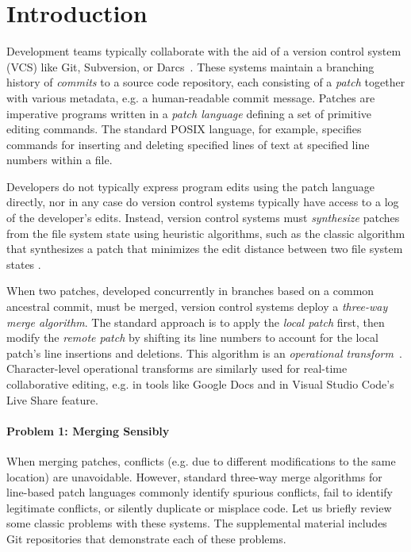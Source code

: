 
\section{Introduction}%
\label{sec:Introduction}

Development teams typically collaborate with the aid of a version control system (VCS) like Git, Subversion, or Darcs~\cite{DBLP:conf/haskell/Roundy05}. 
These systems maintain a branching history of \emph{commits} to a source code repository, each consisting of a \emph{patch} together with various metadata, e.g. a human-readable commit message. Patches are imperative programs written in a 
\emph{patch language} defining a set of primitive editing commands.
The standard POSIX  language, for example, specifies commands for inserting and deleting specified lines of text at specified line numbers within a file. 

Developers do not typically express program edits using the patch language directly, nor in any case do version control systems typically have access to a log of the developer's edits. Instead, version control systems must \emph{synthesize} patches from the file system state using heuristic algorithms, such as the classic  algorithm that synthesizes a patch that minimizes the edit distance between two file system states \cite{DiffAlgorithm}.

When two patches, developed concurrently in branches based on a common ancestral commit, must be merged, version control systems deploy a \emph{three-way merge algorithm}. The standard approach is to apply the \emph{local patch} first, then modify the \emph{remote patch} by shifting its line numbers to account for the local patch's line insertions and deletions. This algorithm is an \emph{operational transform}~\cite{DBLP:conf/sigmod/EllisG89}. 
Character-level operational transforms are similarly used for real-time collaborative editing, e.g. in tools like Google Docs and in Visual Studio Code's Live Share feature. 

\paragraph{Problem 1: Merging Sensibly} 
When merging patches, conflicts (e.g. due to different modifications to the same location) are unavoidable. However, 
standard three-way merge algorithms for line-based patch languages commonly identify spurious conflicts, fail to identify legitimate conflicts, or silently duplicate or misplace code. Let us briefly review some classic problems with these systems. The supplemental material includes Git repositories that demonstrate each of these problems.

